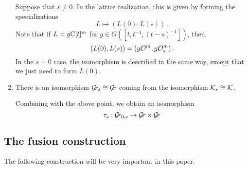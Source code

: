 \documentclass[draft]{article}
\begin{document}
\begin{enumerate}
    Suppose that $ s \ne 0 $.  In the lattice realization, this is given by forming the specializations 
    $$
        L \mapsto (L(0), L(s))\,.
    $$
    Note that if $ L = g \mathbb C[t]^m$ for $ g \in G([t,t^{-1}, (t-s)^{-1}])$, then 
    $$
        (L(0), L(s)) = (g \mathcal O^m, g\mathcal O^m_s)\,. 
    $$
    In the $ s = 0 $ case, the isomorphism is described in the same way, except that we just need to form $ L(0)$.
    
    \item \label{it:grs-gr} There is an isomorphism $ \mathcal{G}\!r_s \cong \mathcal{G}\!r $ coming from the isomorphism $ \mathcal K_s \cong \mathcal K$. 
    
    Combining with the above point, we obtain an isomorphism
    $$
    \tau_s : \mathcal{G}\!r_{0,s} \rightarrow \mathcal{G}\!r \times \mathcal{G}\!r 
    $$
\end{enumerate}


\subsection{The fusion construction}
The following construction will be very important in this paper.  
\end{document}
